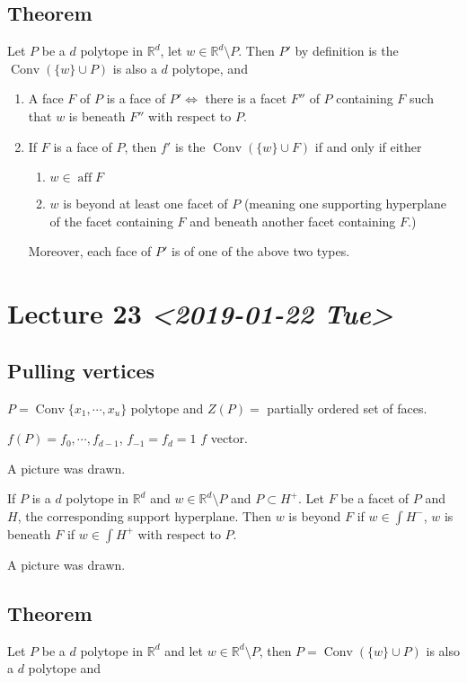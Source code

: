 \documentclass[11pt]{article}
\def\R{\mathbb{R}}
\def\aff{\operatorname{aff}}
\def\conv{\operatorname{Conv}}
\begin{document}
{{{{\subsection{Theorem}
\label{sec:org26b1661}
Let \(P\) be a \(d\) polytope in \(\R^d\), let \(w \in \R^d \setminus P\). Then \(P'\)
by definition is the \(\conv (\{w \} \cup P)\) is also a \(d\) polytope, and 

\begin{enumerate}
\item A face \(F\) of \(P\) is a face of \(P' \iff\) there is a facet \(F''\) of \(P\)
containing \(F\) such that \(w\) is beneath \(F''\) with respect to \(P\).
\item If \(F\) is a face of \(P\), then \(f'\) is the \(\conv(\{w \} \cup F)\) if and
only if either
\begin{enumerate}
\item \(w \in \aff F\)
\item \(w\) is beyond at least one facet of \(P\) (meaning one supporting
hyperplane of the facet containing \(F\) and beneath another facet
containing \(F\).)
\end{enumerate}

Moreover, each face of \(P'\) is of one of the above two types.
\end{enumerate}
\section{Lecture 23 \textit{<2019-01-22 Tue>}}
\label{sec:org1c14728}
\subsection{Pulling vertices}
\label{sec:org34ede0f}
\(P = \conv \{x_1, \cdots, x_u\}\) polytope and \(Z(P) =\) partially ordered set
of faces.

\(f(P) = f_0, \cdots, f_{d-1}\), \(f_{-1} = f_d= 1\) \(f\) vector.


A picture was drawn.

If \(P\) is a \(d\) polytope in \(\R^d\) and \(w \in \R^d \setminus P\) and \(P
   \subset H^{+}\). Let \(F\) be a facet of \(P\) and \(H\), the corresponding support
hyperplane. Then \(w\) is beyond \(F\) if \(w \in \int H^{-}\), \(w\) is beneath \(F\)
if \(w \in \int H^{+}\) with respect to \(P\).

A picture was drawn.
\subsection{Theorem}
\label{sec:org14f0914}
Let \(P\) be a \(d\) polytope in \(\R^d\) and let \(w \in \R^d \setminus P\), then \(P
   = \conv (\{w\} \cup P)\) is also a \(d\) polytope and 

}}}}
\end{document}
